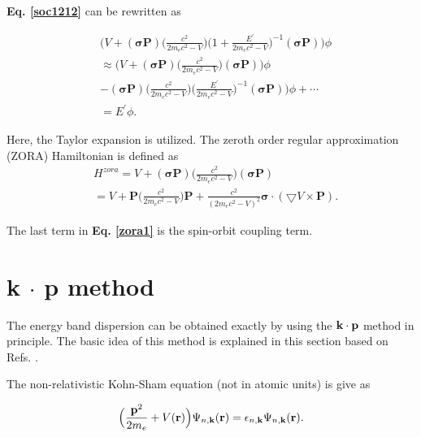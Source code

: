 \documentclass[a4paper, 12pt, titlepage,oneside,drop]{kthesis}
\begin{document}
\textbf{Eq. \ref{soc1212}} can be rewritten as

\begin{equation}\begin{split}\label{soc001}
& \Big(V + (\boldsymbol{\sigma} \textbf{P}) \Big(\frac{c^2}{2m_ec^2-V}\Big)\Big(1+\frac{E^{\prime}}{2m_ec^2-V}\Big)^{-1} (\boldsymbol{\sigma} \textbf{P}) \Big)\phi \\
& \approx \Big( V + (\boldsymbol{\sigma} \textbf{P}) \Big(\frac{c^2}{2m_ec^2-V}\Big)(\boldsymbol{\sigma} \textbf{P}) \Big)\phi \\
& - (\boldsymbol{\sigma} \textbf{P}) \Big(\frac{c^2}{2m_ec^2-V}\Big)\Big(\frac{E^{\prime}}{2m_ec^2-V}\Big)^{-1} (\boldsymbol{\sigma} \textbf{P}) \Big)\phi + \cdots \\
& =E^{\prime}\phi.
\end{split}
\end{equation}

Here, the Taylor expansion is utilized. The zeroth order regular approximation (ZORA) Hamiltonian \cite{van1994relativistic, faas1995zora, van1996zero} is defined as
\begin{equation}\begin{split}\label{zora1}
& H^{zora} = V + (\boldsymbol{\sigma} \textbf{P}) \Big(\frac{c^2}{2m_ec^2-V}\Big)(\boldsymbol{\sigma} \textbf{P}) \\
& =  V + \textbf{P} \Big(\frac{c^2}{2m_ec^2-V}\Big)\textbf{P} + \frac{c^2}{(2m_ec^2-V)^2} \boldsymbol{\sigma}\cdot(\bigtriangledown V\times \textbf{P}).
 \end{split}
\end{equation}

The last term in \textbf{Eq. \ref{zora1}} is the spin-orbit coupling term.



\section{\textbf{k} $\cdot$ \textbf{p} method}
\label{kpmaa}

The energy band dispersion can be obtained exactly by using the $\bold k \cdot \bold p$ method in principle. The basic idea of this method is explained in this section based on Refs. \cite{voon2009kp, kane1966k}.

The non-relativistic Kohn-Sham equation (not in atomic units) is give as

\begin{equation}\label{kpse}
\Big( \frac {{\textbf p}^2} {2m_e} + V({\textbf r}) \Big) \wfbloch<n>< \bold k> = \epsilon_{n,\textbf{k}} \wfbloch<n><\bold k>.
\end{equation}
\end{document}
